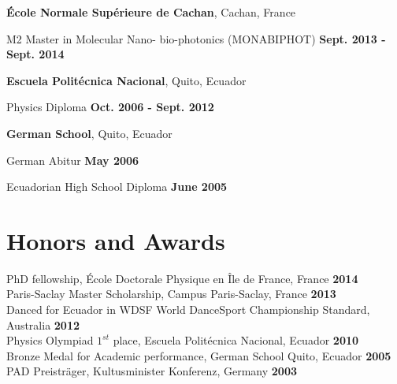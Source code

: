 \documentclass[margin,line]{res}
\newenvironment{list1}{
  \begin{list}{\ding{113}}{%
      \setlength{\itemsep}{0in}
      \setlength{\parsep}{0in} \setlength{\parskip}{0in}
      \setlength{\topsep}{0in} \setlength{\partopsep}{0in}
      \setlength{\leftmargin}{0.17in}}}{\end{list}}
\newenvironment{list2}{
  \begin{list}{$\bullet$}{%
      \setlength{\itemsep}{0in}
      \setlength{\parsep}{0in} \setlength{\parskip}{0in}
      \setlength{\topsep}{0in} \setlength{\partopsep}{0in}
      \setlength{\leftmargin}{0.2in}}}{\end{list}}
\begin{document}
\begin{resume}
{\bf École Normale Supérieure de Cachan}, Cachan, France\\
  \vspace{-.1in}
  \begin{list1}
    \item[] M2 Master in Molecular Nano- bio-photonics (MONABIPHOT) \hfill
{\bf Sept. 2013 - Sept. 2014}
  \end{list1}

  {\bf Escuela Politécnica Nacional}, Quito, Ecuador\\
  \vspace{-.1in}
  \begin{list1}
    \item[] Physics Diploma \hfill {\bf Oct. 2006 - Sept. 2012}\\
  \end{list1}

  {\bf German School}, Quito, Ecuador\\
  \vspace{-.1in}
  \begin{list1}
    \item[] German Abitur \hfill {\bf May 2006}
    \item[] Ecuadorian High School Diploma \hfill {\bf June 2005}
  \end{list1}

\section{\sc Honors and Awards}
PhD fellowship, École Doctorale Physique en Île de France, France \hfill {\bf
  2014}\\
  Paris-Saclay Master Scholarship, Campus Paris-Saclay, France \hfill {\bf
2013}\\
  Danced for Ecuador in WDSF World DanceSport Championship Standard, Australia \hfill {\bf 2012}\\
  Physics Olympiad $1^{st}$ place, Escuela Politécnica Nacional, Ecuador \hfill {\bf 2010}\\
  Bronze Medal for Academic performance, German School Quito, Ecuador \hfill {\bf 2005}\\
  PAD Preisträger, Kultusminister Konferenz, Germany \hfill {\bf 2003}


\end{resume}
\end{document}
